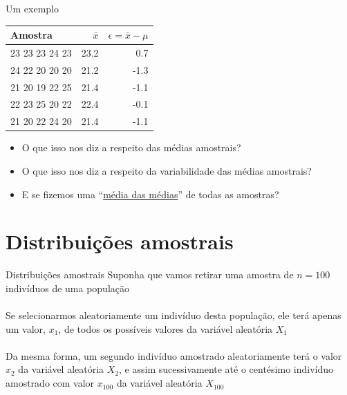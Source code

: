 \documentclass[10pt]{beamer}\usepackage[]{graphicx}\usepackage[]{color}
\theoremstyle{definition}
\begin{document}
\begin{frame}{Um exemplo}
  \begin{table}[h]
    \centering
    \begin{tabular}{lrr}
      \hline
      Amostra & $\bar{x}$ & $\epsilon = \bar{x} - \mu$ \\
      \hline
      23 23 23 24 23 & 23.2 & 0.7 \\
      24 22 20 20 20 & 21.2 & -1.3 \\
      21 20 19 22 25 & 21.4 & -1.1 \\
      22 23 25 20 22 & 22.4 & -0.1 \\
      21 20 22 24 20 & 21.4 & -1.1 \\
      \hline
    \end{tabular}
  \end{table}
  \begin{itemize}
  \item O que isso nos diz a respeito das médias amostrais?
  \item O que isso nos diz a respeito da variabilidade das médias
    amostrais?
  \item E se fizemos uma ``\underline{média das médias}'' de todas as
    amostras?
  \end{itemize}
\end{frame}

\section{Distribuições amostrais}

\begin{frame}[fragile=singleslide]{Distribuições amostrais}
  Suponha que vamos retirar uma amostra de $n = 100$ indivíduos de uma
  população \\~\\
  Se selecionarmos aleatoriamente um indivíduo desta população, ele terá
  apenas um valor, $x_1$, de todos os possíveis valores da variável
  aleatória $X_1$ \\~\\
  Da mesma forma, um segundo indivíduo amostrado aleatoriamente terá o
  valor $x_2$ da variável aleatória $X_2$, e assim sucessivamente até o
  centésimo indivíduo amostrado com valor $x_{100}$ da variável
  aleatória $X_{100}$
\end{frame}
\end{document}
